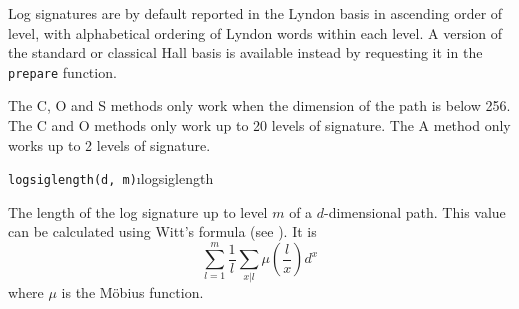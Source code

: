 \documentclass[a4paper]{extarticle}
\newenvironment{defn}{\begin{adjustwidth}{1cm}{}\ignorespaces}{\end{adjustwidth}\ignorespacesafterend}
\begin{document}
Log signatures are by default reported in the Lyndon basis in ascending order of level, with alphabetical ordering of Lyndon words within each level. A version of the standard or classical Hall basis is available instead by requesting it in the \verb|prepare| function.

The C, O and S methods only work when the dimension of the path is below 256. The C and O methods only work up to 20 levels of signature. The A method only works up to 2 levels of signature.

\verb!logsiglength(d, m)!\i{logsiglength}
\begin{defn}
The length of the log signature up to level $m$ of a $d$-dimensional path. This value can be calculated using Witt's formula (see \cite{wikinecklace}). It is
\[\sum_{l=1}^m \frac1l\sum_{x|l}\mu\left(\frac{l}{x}\right)d^x\]
where $\mu$ is the M\"obius function.
\end{defn}
\end{document}
